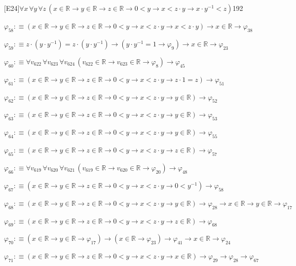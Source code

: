 \begin{fullproof}{[E24]}{$\forall x\,\forall y\,\forall z\,(x \in \mathbb{R} \to y \in \mathbb{R} \to z \in \mathbb{R} \to 0 < y \to x < z \cdot y \to x \cdot y^{-1} < z)$}{192}
\begin{abbrevlist}
\item $\varphi_{58} :\equiv (x \in \mathbb{R} \to y \in \mathbb{R} \to z \in \mathbb{R} \to 0 < y \to x < z \cdot y \to x < z \cdot y) \to x \in \mathbb{R} \to \varphi_{38}$
\item $\varphi_{59} :\equiv z \cdot (y \cdot y^{-1}) = z \cdot (y \cdot y^{-1}) \to (y \cdot y^{-1} = 1 \to \varphi_{9}) \to x \in \mathbb{R} \to \varphi_{23}$
\item $\varphi_{60} :\equiv \forall v_{622}\,\forall v_{623}\,\forall v_{624}\,(v_{622} \in \mathbb{R} \to v_{623} \in \mathbb{R} \to \varphi_{8}) \to \varphi_{45}$
\item $\varphi_{61} :\equiv (x \in \mathbb{R} \to y \in \mathbb{R} \to z \in \mathbb{R} \to 0 < y \to x < z \cdot y \to z \cdot 1 = z) \to \varphi_{51}$
\item $\varphi_{62} :\equiv (x \in \mathbb{R} \to y \in \mathbb{R} \to z \in \mathbb{R} \to 0 < y \to x < z \cdot y \to y \in \mathbb{R}) \to \varphi_{52}$
\item $\varphi_{63} :\equiv (x \in \mathbb{R} \to y \in \mathbb{R} \to z \in \mathbb{R} \to 0 < y \to x < z \cdot y \to y \in \mathbb{R}) \to \varphi_{53}$
\item $\varphi_{64} :\equiv (x \in \mathbb{R} \to y \in \mathbb{R} \to z \in \mathbb{R} \to 0 < y \to x < z \cdot y \to y \in \mathbb{R}) \to \varphi_{55}$
\item $\varphi_{65} :\equiv (x \in \mathbb{R} \to y \in \mathbb{R} \to z \in \mathbb{R} \to 0 < y \to x < z \cdot y \to z \in \mathbb{R}) \to \varphi_{57}$
\item $\varphi_{66} :\equiv \forall v_{619}\,\forall v_{620}\,\forall v_{621}\,(v_{619} \in \mathbb{R} \to v_{620} \in \mathbb{R} \to \varphi_{20}) \to \varphi_{48}$
\item $\varphi_{67} :\equiv (x \in \mathbb{R} \to y \in \mathbb{R} \to z \in \mathbb{R} \to 0 < y \to x < z \cdot y \to 0 < y^{-1}) \to \varphi_{58}$
\item $\varphi_{68} :\equiv (x \in \mathbb{R} \to y \in \mathbb{R} \to z \in \mathbb{R} \to 0 < y \to x < z \cdot y \to y \in \mathbb{R}) \to \varphi_{28} \to x \in \mathbb{R} \to y \in \mathbb{R} \to \varphi_{17}$
\item $\varphi_{69} :\equiv (x \in \mathbb{R} \to y \in \mathbb{R} \to z \in \mathbb{R} \to 0 < y \to x < z \cdot y \to z \in \mathbb{R}) \to \varphi_{68}$
\item $\varphi_{70} :\equiv (x \in \mathbb{R} \to y \in \mathbb{R} \to \varphi_{17}) \to (x \in \mathbb{R} \to \varphi_{23}) \to \varphi_{41} \to x \in \mathbb{R} \to \varphi_{24}$
\item $\varphi_{71} :\equiv (x \in \mathbb{R} \to y \in \mathbb{R} \to z \in \mathbb{R} \to 0 < y \to x < z \cdot y \to x \in \mathbb{R}) \to \varphi_{29} \to \varphi_{28} \to \varphi_{67}$
\end{abbrevlist}
\end{fullproof}
